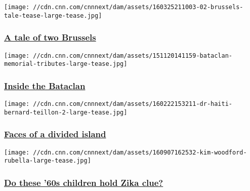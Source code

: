 \href{/2016/03/25/world/tale-of-two-brussels/index.html}{}

\texttt{[image: //cdn.cnn.com/cnnnext/dam/assets/160325211003-02-brussels-tale-tease-large-tease.jpg]}

\hypertarget{a-tale-of-two-brussels}{%
\subsubsection{\texorpdfstring{\href{/2016/03/25/world/tale-of-two-brussels/index.html}{A
tale of two
Brussels}}{A tale of two Brussels}}\label{a-tale-of-two-brussels}}

\href{/2015/11/20/world/paris-attacks-terror-inside-bataclan/index.html}{}

\texttt{[image: //cdn.cnn.com/cnnnext/dam/assets/151120141159-bataclan-memorial-tributes-large-tease.jpg]}

\hypertarget{inside-the-bataclan}{%
\subsubsection{\texorpdfstring{\href{/2015/11/20/world/paris-attacks-terror-inside-bataclan/index.html}{Inside
the Bataclan}}{Inside the Bataclan}}\label{inside-the-bataclan}}

\href{/2016/04/12/world/dominican-republic-haiti-immigration/index.html}{}

\texttt{[image: //cdn.cnn.com/cnnnext/dam/assets/160222153211-dr-haiti-bernard-teillon-2-large-tease.jpg]}

\hypertarget{faces-of-a-divided-island}{%
\subsubsection{\texorpdfstring{\href{/2016/04/12/world/dominican-republic-haiti-immigration/index.html}{Faces
of a divided
island}}{Faces of a divided island}}\label{faces-of-a-divided-island}}

\href{/2016/09/08/health/rubella-house-zika-babies-future/index.html}{}

\texttt{[image: //cdn.cnn.com/cnnnext/dam/assets/160907162532-kim-woodford-rubella-large-tease.jpg]}

\hypertarget{do-these-60s-children-hold-zika-clue}{%
\subsubsection{\texorpdfstring{\href{/2016/09/08/health/rubella-house-zika-babies-future/index.html}{Do
these '60s children hold Zika
clue?}}{Do these '60s children hold Zika clue?}}\label{do-these-60s-children-hold-zika-clue}}

